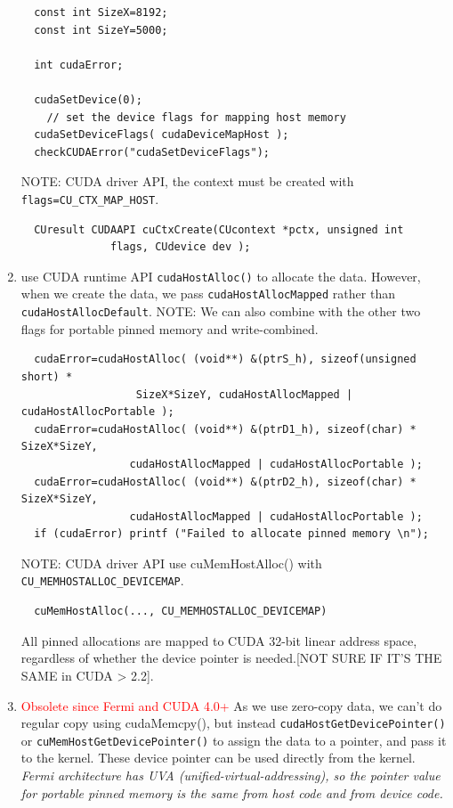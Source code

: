 \begin{enumerate}
\begin{lstlisting}
  const int SizeX=8192;
  const int SizeY=5000;

  int cudaError;  

  cudaSetDevice(0);
    // set the device flags for mapping host memory
  cudaSetDeviceFlags( cudaDeviceMapHost );
  checkCUDAError("cudaSetDeviceFlags");
  \end{lstlisting}
  
  NOTE: CUDA driver API, the context must be created with
  \verb!flags=CU_CTX_MAP_HOST!.
  \begin{verbatim}
  CUresult CUDAAPI cuCtxCreate(CUcontext *pctx, unsigned int
              flags, CUdevice dev );
  \end{verbatim}
  
  \item use CUDA runtime API \verb!cudaHostAlloc()! to allocate the data.
  However, when we create the data, we pass \verb!cudaHostAllocMapped! rather
  than \verb!cudaHostAllocDefault!. NOTE: We can  also combine with the other
  two flags for portable pinned memory and write-combined.
  \begin{lstlisting}
  cudaError=cudaHostAlloc( (void**) &(ptrS_h), sizeof(unsigned short) *
                  SizeX*SizeY, cudaHostAllocMapped | cudaHostAllocPortable ); 
  cudaError=cudaHostAlloc( (void**) &(ptrD1_h), sizeof(char) * SizeX*SizeY,
                 cudaHostAllocMapped | cudaHostAllocPortable );
  cudaError=cudaHostAlloc( (void**) &(ptrD2_h), sizeof(char) * SizeX*SizeY,
                 cudaHostAllocMapped | cudaHostAllocPortable );
  if (cudaError) printf ("Failed to allocate pinned memory \n");                  
  \end{lstlisting}
  NOTE: CUDA driver API use cuMemHostAlloc() with
  \verb!CU_MEMHOSTALLOC_DEVICEMAP!.
  \begin{lstlisting}
  cuMemHostAlloc(..., CU_MEMHOSTALLOC_DEVICEMAP)
  \end{lstlisting}
  
  All pinned allocations are mapped to CUDA 32-bit linear address space,
  regardless of whether the device pointer is needed.[NOT SURE IF IT'S THE
  SAME in CUDA > 2.2].
  
  
  \item \textcolor{red}{Obsolete since Fermi and CUDA 4.0+} As we use
  zero-copy data, we can't do regular copy using cudaMemcpy(), but instead
  \verb!cudaHostGetDevicePointer()! or \verb!cuMemHostGetDevicePointer()! to
  assign the data to a pointer, and  pass it to the kernel. These device pointer
  can be used directly from the kernel. {\it Fermi architecture has UVA
  (unified-virtual-addressing), so the pointer value for portable pinned memory
  is the same from host code and from device code.} 
  

\end{enumerate}
